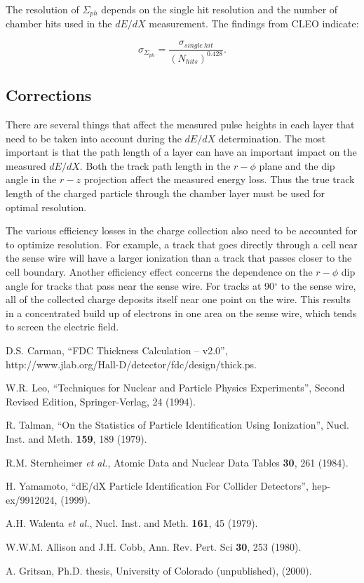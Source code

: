 \documentclass[12pt]{article}
\begin{document}
The resolution of $\Sigma_{ph}$ depends on the single hit resolution
and the number of chamber hits used in the $dE/dX$ measurement.  The
findings from CLEO indicate:

\begin{equation}
\sigma_{\Sigma_{ph}} = \frac{\sigma_{single~hit}}{(N_{hits})^{0.428}}.
\end{equation}

\subsection{Corrections}

There are several things that affect the measured pulse heights in each
layer that need to be taken into account during the $dE/dX$ determination.
The most important is that the path length of a layer can have an
important impact on the measured $dE/dX$.  Both the track path length
in the $r - \phi$ plane and the dip angle in the $r - z$ projection affect
the measured energy loss.  Thus the true track length of the charged
particle through the chamber layer must be used for optimal resolution.

The various efficiency losses in the charge collection also need to be
accounted for to optimize resolution.  For example, a track that goes
directly through a cell near the sense wire will have a larger ionization
than a track that passes closer to the cell boundary.
Another efficiency effect concerns the dependence on the $r - \phi$ dip
angle for tracks that pass near the sense wire.  For tracks at
90$^{\circ}$ to the sense wire, all of the collected charge deposits itself
near one point on the wire.  This results in a concentrated build up of
electrons in one area on the sense wire, which tends to screen the electric
field.

\begin{thebibliography}{99}

D.S. Carman, ``FDC Thickness Calculation -- v2.0'',\\
http://www.jlab.org/Hall-D/detector/fdc/design/thick.ps.

W.R. Leo, ``Techniques for Nuclear and Particle Physics Experiments'',
Second Revised Edition, Springer-Verlag, 24 (1994).

R. Talman, ``On the Statistics of Particle Identification Using
Ionization'', Nucl. Inst. and Meth. {\bf 159}, 189 (1979).

R.M. Sternheimer {\it et al.}, Atomic Data and Nuclear Data Tables {\bf 30},
261 (1984).

H. Yamamoto, ``dE/dX Particle Identification For Collider Detectors'', 
hep-ex/9912024, (1999).

A.H. Walenta {\it et al.}, Nucl. Inst. and Meth. {\bf 161}, 45 (1979).

W.W.M. Allison and J.H. Cobb, Ann. Rev. Pert. Sci {\bf 30}, 253 (1980).

A. Gritsan, Ph.D. thesis, University of Colorado (unpublished), (2000).

\end{thebibliography}
\end{document}
